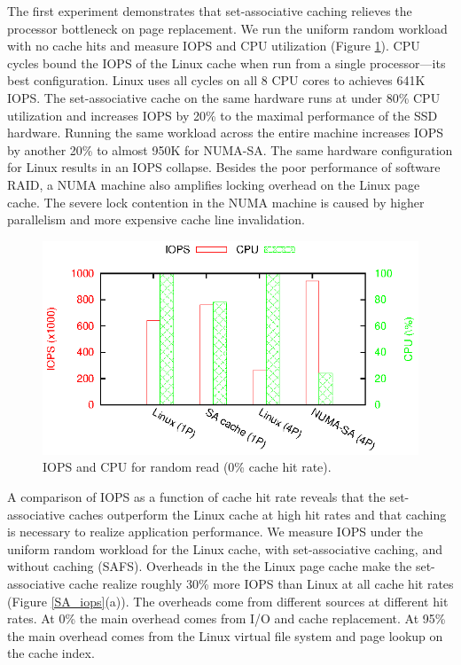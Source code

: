 
The first experiment demonstrates that set-associative caching relieves the processor
bottleneck on page replacement.
We run the uniform random workload with no cache hits and measure
IOPS and CPU utilization (Figure \ref{compare_cache}).
CPU cycles bound the IOPS of the Linux cache when run from a single processor---its best 
configuration.  Linux uses all cycles on all 8 CPU cores to achieves 641K IOPS.  The set-associative 
cache on the same hardware runs at under 80\% CPU utilization and increases IOPS by 20\%
to the maximal performance of the SSD hardware.
Running the same workload across the entire machine increases IOPS by 
another 20\% to almost 950K for NUMA-SA.  The same hardware configuration
for Linux results in an IOPS collapse.
Besides the poor performance of software RAID, a NUMA machine also amplifies
locking overhead on the Linux page cache. The severe lock contention
in the NUMA machine is caused by higher parallelism and
more expensive cache line invalidation.

\begin{figure}[tb]
\begin{center}
\includegraphics[scale=1]{figs/SAFS/compare-cache.eps}
\caption{IOPS and CPU for random read (0\% cache hit rate).}
\label{compare_cache}
\end{center}
\end{figure}

A comparison of IOPS as a function of cache hit rate
reveals that the set-associative caches outperform the Linux cache at high hit rates 
and that caching is necessary to realize application performance.
We measure IOPS under the uniform random workload for the Linux cache,
with set-associative caching, and without caching (SAFS).
Overheads in the the Linux page cache make the set-associative cache 
realize roughly 30\% more IOPS than Linux at all cache hit rates (Figure \ref{SA_iops}(a)).  
The overheads come from different sources at different hit rates.  At 0\% the 
main overhead comes from I/O and cache replacement.  At 95\% the main overhead comes 
from the Linux virtual file system \cite{linux_vfs} and page lookup on the cache index.

